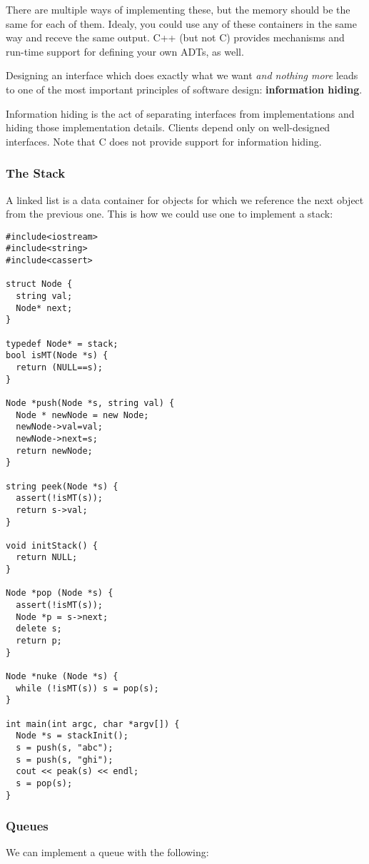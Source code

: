 \documentclass[12pt]{article}
\begin{document}
There are multiple ways of implementing these, but the memory should be the same for each of them. Idealy, you could use any of these containers in the same way and receve the same output. C++ (but not C) provides mechanisms and run-time support for defining your own ADTs, as well.

Designing an interface which does exactly what we want {\it and nothing more} leads to one of the most important principles of software design: {\bf information hiding}.

Information hiding is the act of separating interfaces from implementations and hiding those implementation details. Clients depend only on well-designed interfaces. Note that C does not provide support for information hiding.

\subsubsection*{The Stack}
A linked list is a data container for objects for which we reference the next object from the previous one. This is how we could use one to implement a stack:

\begin{verbatim}
#include<iostream>
#include<string>
#include<cassert>

struct Node {
  string val;
  Node* next;
}

typedef Node* = stack;
bool isMT(Node *s) {
  return (NULL==s);
}

Node *push(Node *s, string val) {
  Node * newNode = new Node;
  newNode->val=val;
  newNode->next=s;
  return newNode;
}

string peek(Node *s) {
  assert(!isMT(s));
  return s->val;
}

void initStack() {
  return NULL;
}

Node *pop (Node *s) {
  assert(!isMT(s));
  Node *p = s->next;
  delete s;
  return p;
}

Node *nuke (Node *s) {
  while (!isMT(s)) s = pop(s);
}

int main(int argc, char *argv[]) {
  Node *s = stackInit();
  s = push(s, "abc");
  s = push(s, "ghi");
  cout << peak(s) << endl;
  s = pop(s);
}
\end{verbatim}

\subsubsection*{Queues}
We can implement a queue with the following:
\end{document}
